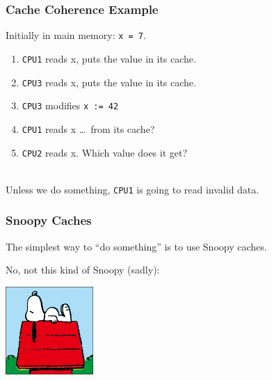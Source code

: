 \begin{frame}
  \frametitle{Cache Coherence Example}

  
  Initially in main memory: {\tt x = 7}.

  \begin{enumerate}
    \item {\tt CPU1} reads x, puts the value in its cache.
    \item {\tt CPU3} reads x, puts the value in its cache.
    \item {\tt CPU3} modifies {\tt x := 42}
    \item {\tt CPU1} reads x \ldots ~from its cache?
    \item {\tt CPU2} reads x. Which value does it get?
  \end{enumerate}
  ~\\

  Unless we do something, {\tt CPU1} is going to read invalid data.
  
\end{frame}



\begin{frame}
\frametitle{Snoopy Caches}

The simplest way to ``do something''
is to use Snoopy caches. 

No, not this kind of Snoopy (sadly):

\begin{center}
	\includegraphics[width=0.25\textwidth]{images/peanuts-snoopy1.jpg}
\end{center}



\end{frame}


